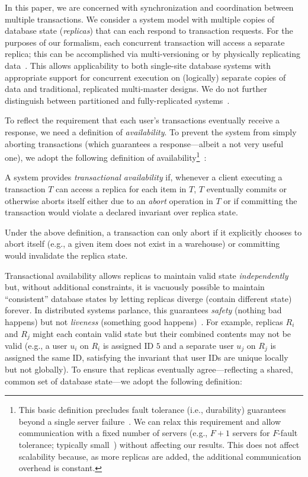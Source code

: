  In this paper, we are concerned with
synchronization and coordination between multiple transactions. We
consider a system model with multiple copies of database state
(\textit{replicas}) that can each respond to transaction requests. For
the purposes of our formalism, each concurrent transaction will access
a separate replica; this can be accomplished via multi-versioning or
by physically replicating data~\cite{bernstein-book}. This allows
applicability to both single-site database systems with appropriate
support for concurrent execution on (logically) separate copies of
data and traditional, replicated multi-master designs. We do not
further distinguish between partitioned and fully-replicated
systems~\cite{hat-vldb}.

 To reflect the requirement that each user's
transactions eventually receive a response, we need a definition of
\textit{availability}. To prevent the system from simply aborting
transactions (which guarantees a response---albeit a not very useful
one), we adopt the following definition of availability\footnote{This
  basic definition precludes fault tolerance (i.e., durability)
  guarantees beyond a single server failure~\cite{hat-vldb}. We can
  relax this requirement and allow communication with a fixed number
  of servers (e.g., $F+1$ servers for $F$-fault tolerance; typically
  small~\cite{spanner,dynamo,megastore}) without affecting our
  results. This does not affect scalability because, as more replicas
  are added, the additional communication overhead is
  constant.}~\cite{hat-vldb}:

\begin{definition} 
A system provides \textit{transactional availability} if, whenever a
client executing a transaction $T$ can access a replica for each item
in $T$, $T$ eventually commits or otherwise aborts itself either due
to an \textit{abort} operation in $T$ or if committing the transaction
would violate a declared invariant over replica state.
\end{definition}

Under the above definition, a transaction can only abort if it
explicitly chooses to abort itself (e.g., a given item does not exist
in a warehouse) or committing would invalidate the replica state.

 Transactional availability allows replicas to
maintain valid state \textit{independently} but, without additional
constraints, it is vacuously possible to maintain ``consistent''
database states by letting replicas diverge (contain different state)
forever. In distributed systems parlance, this guarantees
\textit{safety} (nothing bad happens) but not \textit{liveness}
(something good happens)~\cite{schneider-concurrent}. For example,
replicas $R_i$ and $R_j$ might each contain valid state but their
combined contents may not be valid (e.g., a user $u_i$ on $R_i$ is
assigned ID $5$ and a separate user $u_j$ on $R_j$ is assigned the
same ID, satisfying the invariant that user IDs are unique locally but
not globally). To ensure that replicas eventually agree---reflecting a
shared, common set of database state---we adopt the following
definition:

